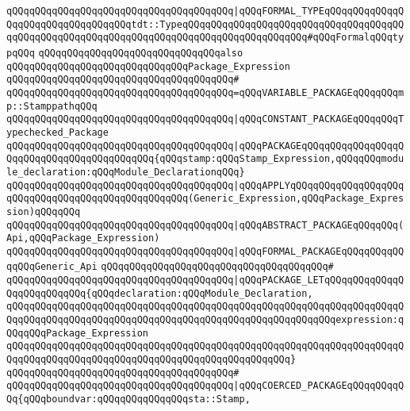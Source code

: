 \verb|qQQqqQQqqQQqqQQqqQQqqQQqqQQqqQQqqQQqqQQq|\verb#|qQQqFORMAL_TYPEqQQqqQQqqQQqqQQqqQQqqQQqqQQqqQQqqQQqtdt::TypeqQQqqQQqqQQqqQQqqQQqqQQqqQQqqQQqqQQqqQQqqQQqqQQqqQQqqQQqqQQqqQQqqQQqqQQqqQQqqQQqqQQqqQQqqQQq#\verb|#qQQqFormalqQQqtypqQQq|\newline
\newline
\newline
\newline
\verb|qQQqqQQqqQQqqQQqqQQqqQQqqQQqqQQqalso|\newline
\verb|qQQqqQQqqQQqqQQqqQQqqQQqqQQqqQQqPackage_Expression|\newline
\verb|qQQqqQQqqQQqqQQqqQQqqQQqqQQqqQQqqQQqqQQq#|\newline
\verb|qQQqqQQqqQQqqQQqqQQqqQQqqQQqqQQqqQQqqQQq=qQQqVARIABLE_PACKAGEqQQqqQQqmp::StamppathqQQq|\newline
\verb|qQQqqQQqqQQqqQQqqQQqqQQqqQQqqQQqqQQqqQQq|\verb#|qQQqCONSTANT_PACKAGEqQQqqQQqTypechecked_Package#\newline
\verb|qQQqqQQqqQQqqQQqqQQqqQQqqQQqqQQqqQQqqQQq|\verb#|qQQqPACKAGEqQQqqQQqqQQqqQQqqQQqqQQqqQQqqQQqqQQqqQQqqQQq{qQQqstamp:qQQqStamp_Expression,qQQqqQQqmodule_declaration:qQQqModule_DeclarationqQQq}#\newline
\verb|qQQqqQQqqQQqqQQqqQQqqQQqqQQqqQQqqQQqqQQq|\verb#|qQQqAPPLYqQQqqQQqqQQqqQQqqQQqqQQqqQQqqQQqqQQqqQQqqQQqqQQqqQQq(Generic_Expression,qQQqPackage_Expression)qQQqqQQq#\newline
\verb|qQQqqQQqqQQqqQQqqQQqqQQqqQQqqQQqqQQqqQQq|\verb#|qQQqABSTRACT_PACKAGEqQQqqQQq(Api,qQQqPackage_Expression)#\newline
\verb|qQQqqQQqqQQqqQQqqQQqqQQqqQQqqQQqqQQqqQQq|\verb#|qQQqFORMAL_PACKAGEqQQqqQQqqQQqqQQqGeneric_Api#\newline
\verb|qQQqqQQqqQQqqQQqqQQqqQQqqQQqqQQqqQQqqQQq#|\newline
\verb|qQQqqQQqqQQqqQQqqQQqqQQqqQQqqQQqqQQqqQQq|\verb#|qQQqPACKAGE_LETqQQqqQQqqQQqqQQqqQQqqQQqqQQq{qQQqdeclaration:qQQqModule_Declaration,#\newline
\verb|qQQqqQQqqQQqqQQqqQQqqQQqqQQqqQQqqQQqqQQqqQQqqQQqqQQqqQQqqQQqqQQqqQQqqQQqqQQqqQQqqQQqqQQqqQQqqQQqqQQqqQQqqQQqqQQqqQQqqQQqqQQqqQQqexpression:qQQqqQQqPackage_Expression|\newline
\verb|qQQqqQQqqQQqqQQqqQQqqQQqqQQqqQQqqQQqqQQqqQQqqQQqqQQqqQQqqQQqqQQqqQQqqQQqqQQqqQQqqQQqqQQqqQQqqQQqqQQqqQQqqQQqqQQqqQQqqQQq}|\newline
\verb|qQQqqQQqqQQqqQQqqQQqqQQqqQQqqQQqqQQqqQQq#|\newline
\verb|qQQqqQQqqQQqqQQqqQQqqQQqqQQqqQQqqQQqqQQq|\verb#|qQQqCOERCED_PACKAGEqQQqqQQqqQQq{qQQqboundvar:qQQqqQQqqQQqqQQqsta::Stamp,#\newline
